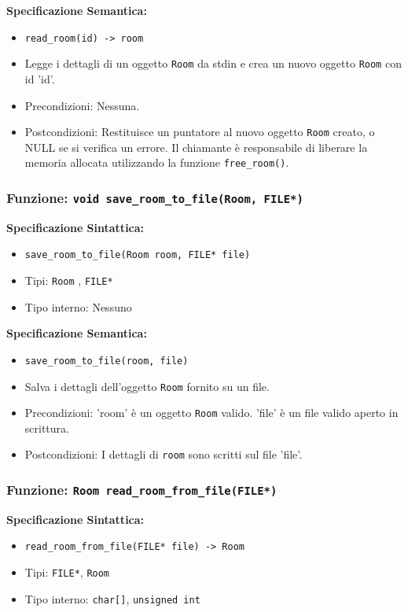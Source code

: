\documentclass[11pt]{scrartcl} %
\begin{document}
\textbf{Specificazione Semantica:}
\begin{itemize}
	\item \texttt{read\_room(id) -> room}
	\item Legge i dettagli di un oggetto \texttt{Room} da stdin e crea un nuovo oggetto \texttt{Room} con id 'id'.
	\item Precondizioni: Nessuna.
	\item Postcondizioni: Restituisce un puntatore al nuovo oggetto \texttt{Room} creato, o NULL se si verifica un errore. Il chiamante è responsabile di liberare la memoria allocata utilizzando la funzione \texttt{free\_room()}.
\end{itemize}

\subsubsection{Funzione: \texttt{void save\_room\_to\_file(Room, FILE*)}}

\textbf{Specificazione Sintattica:}
\begin{itemize}
	\item \texttt{save\_room\_to\_file(Room room, FILE* file)}
	\item Tipi: \texttt{Room} , \texttt{FILE*}
	\item Tipo interno: Nessuno
\end{itemize}

\textbf{Specificazione Semantica:}
\begin{itemize}
	\item \texttt{save\_room\_to\_file(room, file)}
	\item Salva i dettagli dell'oggetto \texttt{Room} fornito su un file.
	\item Precondizioni: 'room' è un oggetto \texttt{Room} valido. 'file' è un file valido aperto in scrittura.
	\item Postcondizioni: I dettagli di \texttt{room} sono scritti sul file 'file'.
\end{itemize}

\subsubsection{Funzione: \texttt{Room read\_room\_from\_file(FILE*)}}

\textbf{Specificazione Sintattica:}
\begin{itemize}
	\item \texttt{read\_room\_from\_file(FILE* file) -> Room}
	\item Tipi: \texttt{FILE*}, \texttt{Room}
	\item Tipo interno: \texttt{char[]}, \texttt{unsigned int}
\end{itemize}
\end{document}

